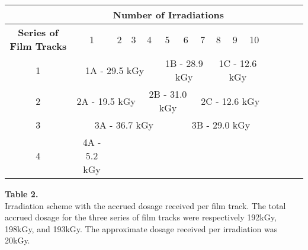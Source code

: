 \documentclass{article}
\begin{document}
\begin{center}
    \begin{tabular}{ |c|c|c|c|c|c|c|c|c|c|c|c|c|c|c| }
    \hline
    \multicolumn{1}{|c|}{ } &
    \multicolumn{10}{|c|}{\textbf{Number of Irradiations}}\\
    \hline
     \textbf{Series of Film Tracks} & 1 & 2 & 3 & 4 & 5 & 6 & 7 & 8 & 9 & 10 \\
     \hline
     1 & \multicolumn{4}{|c|}{1A - 29.5 kGy} & \multicolumn{3}{|c|}{1B - 28.9 kGy} & \multicolumn{3}{|c|}{1C - 12.6 kGy} \\
    \hline
    2 & \multicolumn{3}{|c|}{2A - 19.5 kGy} & \multicolumn{3}{|c|}{2B - 31.0 kGy} & \multicolumn{4}{|c|}{2C - 12.6 kGy} \\
    \hline
    3 & \multicolumn{5}{|c|}{3A - 36.7 kGy} & \multicolumn{5}{|c|}{3B - 29.0 kGy} \\
    \hline
    4 & \multicolumn{1}{|c|}{4A - 5.2 kGy} & \multicolumn{9}{|c|}{ } \\
    \hline
    \end{tabular}
    
    \textbf{Table 2.} \\
    Irradiation scheme with the accrued dosage received per film track. The total accrued dosage for the three series of film tracks were respectively 192kGy, 198kGy, and 193kGy. The approximate dosage received per irradiation was 20kGy.
   
\end{center}
\end{document}
